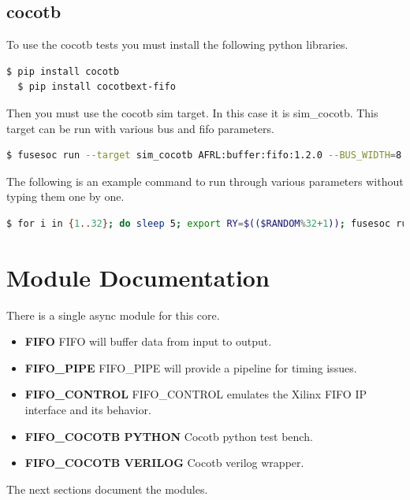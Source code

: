\subsection{cocotb}
\par
To use the cocotb tests you must install the following python libraries.
\begin{lstlisting}[language=bash]
  $ pip install cocotb
  $ pip install cocotbext-fifo
\end{lstlisting}

Then you must use the cocotb sim target. In this case it is sim\_cocotb. This target can be run with various bus and fifo parameters.
\begin{lstlisting}[language=bash]
  $ fusesoc run --target sim_cocotb AFRL:buffer:fifo:1.2.0 --BUS_WIDTH=8 --FIFO_DEPTH=32
\end{lstlisting}

The following is an example command to run through various parameters without typing them one by one.
\begin{lstlisting}[language=bash]
  $ for i in {1..32}; do sleep 5; export RY=$(($RANDOM%32+1)); fusesoc run --target sim_cocotb AFRL:buffer:axis_fifo:1.0.0 --BUS_WIDTH=$i --FIFO_DEPTH=$RY; echo "BUS WIDTH:" $i "FIFO DEPTH:" $RY; done
\end{lstlisting}
\newpage

\section{Module Documentation} \label{Module Documentation}

\par
There is a single async module for this core.

\begin{itemize}
\item \textbf{FIFO} FIFO will buffer data from input to output.\\
\item \textbf{FIFO\_PIPE} FIFO\_PIPE will provide a pipeline for timing issues.\\
\item \textbf{FIFO\_CONTROL} FIFO\_CONTROL emulates the Xilinx FIFO IP interface and its behavior.\\
\item \textbf{FIFO\_COCOTB PYTHON} Cocotb python test bench.\\
\item \textbf{FIFO\_COCOTB VERILOG} Cocotb verilog wrapper.\\
\end{itemize}
The next sections document the modules.

